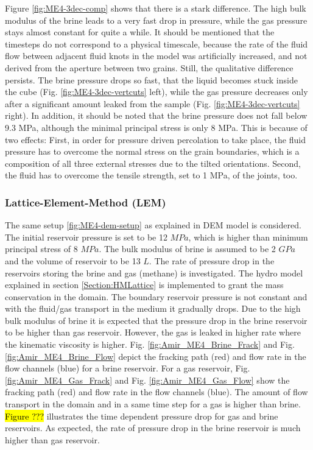 Figure \ref{fig:ME4-3dec-comp} shows that there is a stark difference. The high bulk modulus of the brine leads to a very fast drop in pressure, while the gas pressure stays almost constant for quite a while. It should be mentioned that the timesteps do not correspond to a physical timescale, because the rate of the fluid flow between adjacent fluid knots in the model was artificially increased, and not derived from the aperture between two grains. Still, the qualitative difference persists. The brine pressure drops so fast, that the liquid becomes stuck inside the cube (Fig. \ref{fig:ME4-3dec-vertcuts} left), while the gas pressure decreases only after a significant amount leaked from the sample (Fig. \ref{fig:ME4-3dec-vertcuts} right). In addition, it should be noted that the brine pressure does not fall below 9.3 MPa, although the minimal principal stress is only 8 MPa. This is because of two effects: First, in order for pressure driven percolation to take place, the fluid pressure has to overcome the normal stress on the grain boundaries, which is a composition of all three external stresses due to the tilted orientations. Second, the fluid has to overcome the tensile strength, set to 1 MPa, of the joints, too. 

\subsubsection*{Lattice-Element-Method (LEM)}

The same setup \ref{fig:ME4-dem-setup} as explained in DEM model is considered. The initial reservoir pressure is set to be 12 $MPa$, which is higher than minimum principal stress of 8 $MPa$. The bulk modulus of brine is assumed to be 2 $GPa$ and the volume of reservoir to be 13 $L$. The rate of pressure drop in the reservoirs storing the brine and gas (methane) is investigated. The hydro model explained in section \ref{Section:HMLattice} is implemented to grant the mass conservation in the domain. The boundary reservoir pressure is not constant and with the fluid/gas transport in the medium it gradually drops. Due to the high bulk modulus of brine it is expected that the pressure drop in the brine reservoir to be higher than gas reservoir. However, the gas is leaked in higher rate where the kinematic viscosity is higher. Fig. \ref{fig:Amir_ME4_Brine_Frack} and Fig. \ref{fig:Amir_ME4_Brine_Flow} depict the fracking path (red) and flow rate in the flow channels (blue) for a brine reservoir. For a gas reservoir, Fig. \ref{fig:Amir_ME4_Gas_Frack} and Fig. \ref{fig:Amir_ME4_Gas_Flow} show the fracking path (red) and flow rate in the flow channels (blue). The amount of flow transport in the domain and in a same time step for a gas is higher than brine. \hl{Figure ???} illustrates the time dependent pressure drop for gas and brine reservoirs. As expected, the rate of pressure drop in the brine reservoir is much higher than gas reservoir.

